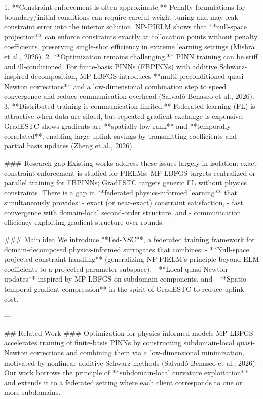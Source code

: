 1. **Constraint enforcement is often approximate.** Penalty formulations for boundary/initial conditions can require careful weight tuning and may leak constraint error into the interior solution. NP-PIELM shows that **null-space projection** can enforce constraints exactly at collocation points without penalty coefficients, preserving single-shot efficiency in extreme learning settings (Mishra et al., 2026).  
2. **Optimization remains challenging.** PINN training can be stiff and ill-conditioned. For finite-basis PINNs (FBPINNs) with additive Schwarz-inspired decomposition, MP-LBFGS introduces **multi-preconditioned quasi-Newton corrections** and a low-dimensional combination step to speed convergence and reduce communication overhead (Salvadó-Benasco et al., 2026).  
3. **Distributed training is communication-limited.** Federated learning (FL) is attractive when data are siloed, but repeated gradient exchange is expensive. GradESTC shows gradients are **spatially low-rank** and **temporally correlated**, enabling large uplink savings by transmitting coefficients and partial basis updates (Zheng et al., 2026).

### Research gap  
Existing works address these issues largely in isolation: exact constraint enforcement is studied for PIELMs; MP-LBFGS targets centralized or parallel training for FBPINNs; GradESTC targets generic FL without physics constraints. There is a gap in **federated physics-informed learning** that simultaneously provides:  
- exact (or near-exact) constraint satisfaction,  
- fast convergence with domain-local second-order structure, and  
- communication efficiency exploiting gradient structure over rounds.

### Main idea  
We introduce **Fed-NSC**, a federated training framework for domain-decomposed physics-informed surrogates that combines:  
- **Null-space projected constraint handling** (generalizing NP-PIELM’s principle beyond ELM coefficients to a projected parameter subspace),  
- **Local quasi-Newton updates** inspired by MP-LBFGS on subdomain components, and  
- **Spatio-temporal gradient compression** in the spirit of GradESTC to reduce uplink cost.

---

## Related Work  
### Optimization for physics-informed models  
MP-LBFGS accelerates training of finite-basis PINNs by constructing subdomain-local quasi-Newton corrections and combining them via a low-dimensional minimization, motivated by nonlinear additive Schwarz methods (Salvadó-Benasco et al., 2026). Our work borrows the principle of **subdomain-local curvature exploitation** and extends it to a federated setting where each client corresponds to one or more subdomains.

